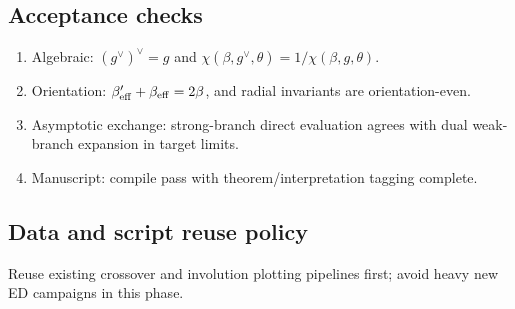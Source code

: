 \subsection{Acceptance checks}

\begin{enumerate}
  \item Algebraic: \((g^\vee)^\vee=g\) and \(\chi(\beta,g^\vee,\theta)=1/\chi(\beta,g,\theta)\).
  \item Orientation: \(\beta_{\mathrm{eff}}'+\beta_{\mathrm{eff}}=2\beta\), and radial invariants are orientation-even.
  \item Asymptotic exchange: strong-branch direct evaluation agrees with dual weak-branch expansion in target limits.
  \item Manuscript: compile pass with theorem/interpretation tagging complete.
\end{enumerate}

\subsection{Data and script reuse policy}
Reuse existing crossover and involution plotting pipelines first; avoid heavy new ED campaigns in
this phase.
